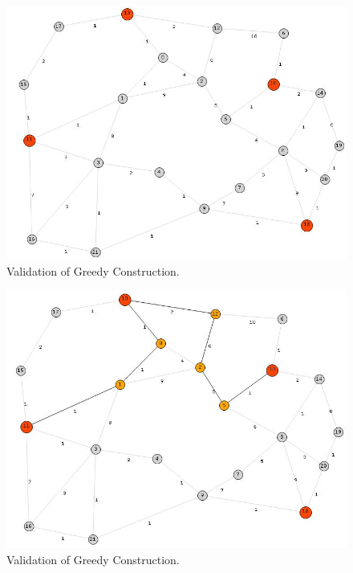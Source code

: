 \begin{figure}[H]
\begin{center}
\includegraphics[scale=0.6]{17.jpg}
\caption{Validation of Greedy Construction.}\label{fig:17}
\end{center} 
\end{figure}

\begin{figure}[H]
 \begin{center}
\includegraphics[scale=0.6]{18-1.jpg}
\caption{Validation of Greedy Construction.} \label{fig:18a}
 \end{center}
\end{figure}


